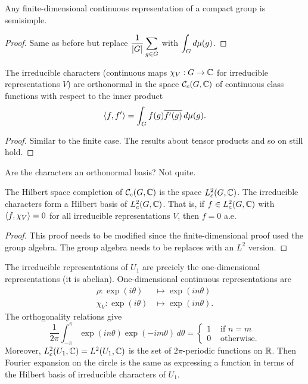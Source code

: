 \begin{thm}
  Any finite-dimensional continuous representation of a compact group is semisimple.
\end{thm}

\begin{proof}
  Same as before but replace $\displaystyle \frac{1}{\left\lvert G \right\rvert} \sum_{g \in G}$ with $\displaystyle \int_G d\mu(g)$.
\end{proof}

\begin{thm}
  The irreducible characters (continuous maps $\chi_V: G \to \mathbb{C}$ for irreducible representations $V$) are orthonormal in the space $\mathcal{C}_c(G,\mathbb{C})$ of continuous class functions with respect to the inner product
  \[ {\left\langle f,f' \right\rangle} = \int_G f(g) \overline{f'(g)} \, d\mu(g).\]
\end{thm}

\begin{proof}
  Similar to the finite case.
  The results about tensor products and so on still hold.
\end{proof}

Are the characters an orthonormal basis? Not quite.

\begin{thm}
  The Hilbert space completion of $\mathcal{C}_c(G,\mathbb{C})$ is the space $L_c^2(G,\mathbb{C})$.
  The irreducible characters form a Hilbert basis of $L^2_c(G,\mathbb{C})$.
  That is, if $f \in L^2_c(G,\mathbb{C})$ with ${\left\langle f,\chi_V \right\rangle}=0$ for all irreducible representations $V$, then $f=0$ a.e.
\end{thm}

\begin{proof}
  This proof needs to be modified since the finite-dimensional proof used the group algebra.
  The group algebra needs to be replaces with an $L^2$ version.
\end{proof}

\begin{exam}
  The irreducible representations of $U_1$ are preciely the one-dimensional representations (it is abelian).
  One-dimensional continuous representations are
  \begin{align*}
    \rho: \exp(i\theta) &\mapsto \exp(in\theta) \\
    \chi_V: \exp(i\theta) &\mapsto \exp(in\theta).
  \end{align*}
  The orthogonality relations give
  \[ \frac{1}{2\pi} \int_{-\pi}^\pi \exp(in\theta) \exp(-im\theta) \, d\theta =
    \begin{cases}
      1 & \text{ if } n=m \\
      0 & \text{ otherwise}.
    \end{cases}
  \]
  Moreover, $L^2_c(U_1,\mathbb{C})=L^2(U_1,\mathbb{C})$ is the set of $2\pi$-periodic functions on $\mathbb{R}$.
  Then Fourier expansion on the circle is the same as expressing a function in terms of the Hilbert basis of irreducible characters of $U_1$.
\end{exam}

